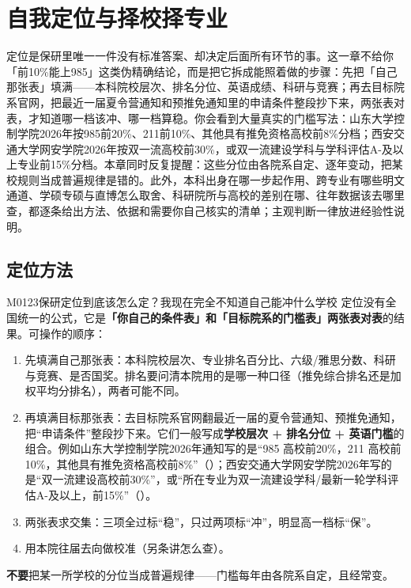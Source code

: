\chapter{自我定位与择校择专业}
\label{ch03}
\begin{keybox}
定位是保研里唯一一件没有标准答案、却决定后面所有环节的事。这一章不给你「前10\%能上985」这类伪精确结论，而是把它拆成能照着做的步骤：先把「自己那张表」填满——本科院校层次、排名分位、英语成绩、科研与竞赛；再去目标院系官网，把最近一届夏令营通知和预推免通知里的申请条件整段抄下来，两张表对表，才知道哪一档该冲、哪一档算稳。你会看到大量真实的门槛写法：山东大学控制学院2026年按985前20\%、211前10\%、其他具有推免资格高校前8\%分档；西安交通大学网安学院2026年按双一流高校前30\%，或双一流建设学科与学科评估A-及以上专业前15\%分档。本章同时反复提醒：这些分位由各院系自定、逐年变动，把某校规则当成普遍规律是错的。此外，本科出身在哪一步起作用、跨专业有哪些明文通道、学硕专硕与直博怎么取舍、科研院所与高校的差别在哪、往年数据该去哪里查，都逐条给出方法、依据和需要你自己核实的清单；主观判断一律放进经验性说明。
\end{keybox}

\section{定位方法}
\begin{qa}{M0123}{保研定位到底该怎么定？我现在完全不知道自己能冲什么学校}
定位没有全国统一的公式，它是\textbf{「你自己的条件表」和「目标院系的门槛表」两张表对表}的结果。可操作的顺序：
\begin{enumerate}
  \item 先填满自己那张表：本科院校层次、专业排名百分比、六级/雅思分数、科研与竞赛、是否国奖。排名要问清本院用的是哪一种口径（推免综合排名还是加权平均分排名），两者可能不同。
  \item 再填满目标那张表：去目标院系官网翻最近一届的夏令营通知、预推免通知，把“申请条件”整段抄下来。它们一般写成\textbf{学校层次 + 排名分位 + 英语门槛}的组合。例如山东大学控制学院2026年通知写的是“985 高校前20\%，211 高校前10\%，其他具有推免资格高校前8\%”（）；西安交通大学网安学院2026年写的是“双一流建设高校前30\%”，或“所在专业为双一流建设学科/最新一轮学科评估A-及以上，前15\%”（）。
  \item 两张表求交集：三项全过标“稳”，只过两项标“冲”，明显高一档标“保”。
  \item 用本院往届去向做校准（另条讲怎么查）。
\end{enumerate}
\textbf{不要}把某一所学校的分位当成普遍规律——门槛每年由各院系自定，且经常变。
\end{qa}

